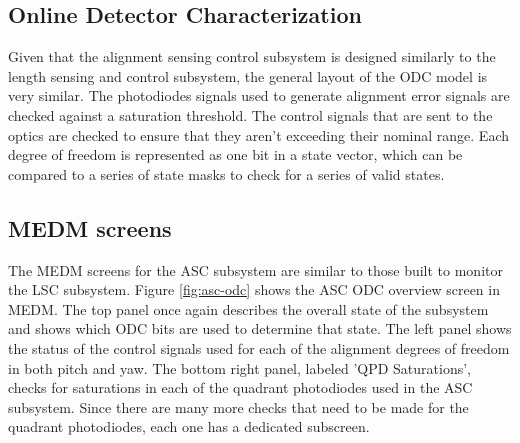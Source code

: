 \subsection{Online Detector Characterization}

Given that the alignment sensing control subsystem is designed similarly 
to the length sensing and control subsystem, the general layout of the ODC 
model is very similar. The photodiodes signals used to generate alignment 
error signals are checked against a saturation threshold. The control 
signals that are sent to the optics are checked to ensure that they aren't 
exceeding their nominal range. Each degree of freedom is represented as one 
bit in a state vector, which can be compared to a series of state masks to 
check for a series of valid states. 

\subsection{MEDM screens}

The MEDM screens for the ASC subsystem are similar to those built to monitor 
the LSC subsystem. 
Figure \ref{fig:asc-odc} shows the ASC ODC overview screen in MEDM. 
The top panel once again describes the overall state of the subsystem and 
shows which ODC bits are used to determine that state. The left panel shows 
the status of the control signals used for each of the alignment degrees of 
freedom in both pitch and yaw. The bottom right panel, labeled 'QPD Saturations', 
checks for saturations in each of the quadrant photodiodes used in the ASC subsystem. 
Since there are many more checks that need to be made for the quadrant photodiodes, 
each one has a dedicated subscreen.


